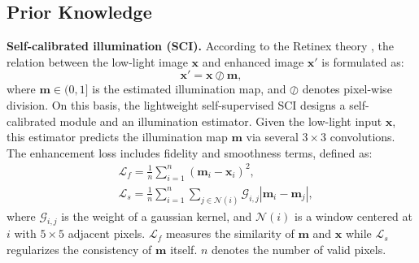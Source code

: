 \documentclass[lettersize,journal]{IEEEtran}
\begin{document}
\subsection{Prior Knowledge}\label{sec_prior}
\textbf{Self-calibrated illumination (SCI).} According to the Retinex theory \cite{land1977retinex}, the relation between the low-light image $\boldsymbol x$ and enhanced image $\boldsymbol x'$ is formulated as: 
\begin{equation}\label{eq_retinex}
\boldsymbol x'=\boldsymbol x \oslash \boldsymbol m,
\end{equation}
where $\boldsymbol m\in (0, 1]$ is the estimated illumination map, and $\oslash$ denotes pixel-wise division. On this basis, the lightweight self-supervised SCI \cite{ma2022toward} designs %
a self-calibrated module and an illumination estimator. Given the low-light input $\boldsymbol x$, this estimator predicts the illumination map $\boldsymbol m$ via several $3\times 3$ convolutions. The enhancement loss includes fidelity and smoothness terms, defined as: 
\begin{equation}\label{eq_lf_ls}
\begin{split}
&{\mathcal{L}_{f}}=\frac{1}{n}\sum_{i=1}^{n}{{\left( \boldsymbol m_i-\boldsymbol x_i \right)}^{2}},\\
&{\mathcal{L}_{s}}=\frac{1}{n}\sum\limits_{i=1}^{n}{\sum\limits_{j\in \mathcal{N}\left( i \right)}{{{\mathcal{G}}_{i,j}}\left| {{\boldsymbol m}_{i}}-{{\boldsymbol m}_{j}} \right|}}, 
\end{split}
\end{equation}
where $\mathcal{G}_{i,j}$ is the weight of a gaussian kernel, and $\mathcal{N}\left( i \right)$ is a window centered at $i$ with $5\times 5$ adjacent pixels. $\mathcal{L}_{f}$ measures the similarity of $\boldsymbol m$ and $\boldsymbol x$ while $\mathcal{L}_{s}$ regularizes the consistency of $\boldsymbol m$ itself. $n$ denotes the number of valid pixels. 
\end{document}
